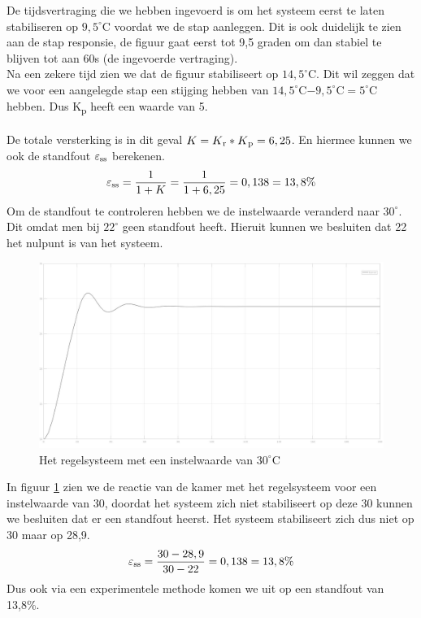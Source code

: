 \documentclass[a4paper, 12pt]{article}
\begin{document}
\noindent De tijdsvertraging die we hebben ingevoerd is om het systeem eerst te laten stabiliseren op $9,5^\circ$C voordat we de stap aanleggen. Dit is ook duidelijk te zien aan de stap responsie, de figuur gaat eerst tot 9,5 graden om dan stabiel te blijven tot aan 60s (de ingevoerde vertraging).\\
Na een zekere tijd zien we dat de figuur stabiliseert op $14,5^\circ$C. Dit wil zeggen dat we voor een aangelegde stap een stijging hebben van $14,5^\circ$C$ - 9,5^\circ$C$ = 5^\circ$C hebben. Dus K\textsubscript{p} heeft een waarde van 5. \\ \\
De totale versterking is in dit geval $K = K\textsubscript{r} * K\textsubscript{p} = 6,25$. En hiermee kunnen we ook de standfout $\varepsilon\textsubscript{ss}$ berekenen.
\begin{equation}
	\varepsilon\textsubscript{ss} = \frac{1}{1+K} = \frac{1}{1+6,25} = 0,138 = 13,8\%
\end{equation}
Om de standfout te controleren hebben we de instelwaarde veranderd naar $30^\circ$. Dit omdat men bij $22^\circ$ geen standfout heeft. Hieruit kunnen we besluiten dat 22 het nulpunt is van het systeem. \\
\begin{figure}[!h]
	\includegraphics[width=1\linewidth]{Labo4_1_step_response_kamer_standfout.jpg}
	\caption {Het regelsysteem met een instelwaarde van $30^\circ$C}
	\label{fig:standfout}
\end{figure}

\newpage

\noindent In figuur \ref{fig:standfout} zien we de reactie van de kamer met het regelsysteem voor een instelwaarde van 30, doordat het systeem zich niet stabiliseert op deze 30 kunnen we besluiten dat er een standfout heerst. Het systeem stabiliseert zich dus niet op 30 maar op 28,9.
\begin{equation}
	\varepsilon\textsubscript{ss} = \frac{30-28,9}{30-22} = 0,138 = 13,8\%
\end{equation}
Dus ook via een experimentele methode komen we uit op een standfout van 13,8\%.
\end{document}
